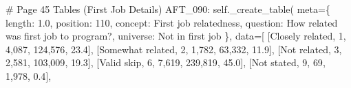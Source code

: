 \documentclass[
  11pt,
  a4paper,
]{article}
\newenvironment{Shaded}{\begin{snugshade}}{\end{snugshade}}
\newcommand{\CommentTok}[1]{\textcolor[rgb]{0.37,0.37,0.37}{#1}}
\newcommand{\NormalTok}[1]{\textcolor[rgb]{0.00,0.23,0.31}{#1}}
\newcommand{\OperatorTok}[1]{\textcolor[rgb]{0.37,0.37,0.37}{#1}}
\newcommand{\StringTok}[1]{\textcolor[rgb]{0.13,0.47,0.30}{#1}}
\newcommand{\VariableTok}[1]{\textcolor[rgb]{0.07,0.07,0.07}{#1}}
\begin{document}
\begin{Shaded}
\begin{Highlighting}[]
    \CommentTok{\# Page 45 Tables (First Job Details)}
    \StringTok{\textquotesingle{}AFT\_090\textquotesingle{}}\NormalTok{: }\VariableTok{self}\NormalTok{.\_create\_table(}
\NormalTok{        meta}\OperatorTok{=}\NormalTok{\{}
            \StringTok{\textquotesingle{}length\textquotesingle{}}\NormalTok{: }\StringTok{\textquotesingle{}1.0\textquotesingle{}}\NormalTok{, }\StringTok{\textquotesingle{}position\textquotesingle{}}\NormalTok{: }\StringTok{\textquotesingle{}110\textquotesingle{}}\NormalTok{,}
            \StringTok{\textquotesingle{}concept\textquotesingle{}}\NormalTok{: }\StringTok{\textquotesingle{}First job relatedness\textquotesingle{}}\NormalTok{,}
            \StringTok{\textquotesingle{}question\textquotesingle{}}\NormalTok{: }\StringTok{\textquotesingle{}How related was first job to program?\textquotesingle{}}\NormalTok{,}
            \StringTok{\textquotesingle{}universe\textquotesingle{}}\NormalTok{: }\StringTok{\textquotesingle{}Not in first job\textquotesingle{}}
\NormalTok{        \},}
\NormalTok{        data}\OperatorTok{=}\NormalTok{[}
\NormalTok{            [}\StringTok{\textquotesingle{}Closely related\textquotesingle{}}\NormalTok{, }\StringTok{\textquotesingle{}1\textquotesingle{}}\NormalTok{, }\StringTok{\textquotesingle{}4,087\textquotesingle{}}\NormalTok{, }\StringTok{\textquotesingle{}124,576\textquotesingle{}}\NormalTok{, }\StringTok{\textquotesingle{}23.4\textquotesingle{}}\NormalTok{],}
\NormalTok{            [}\StringTok{\textquotesingle{}Somewhat related\textquotesingle{}}\NormalTok{, }\StringTok{\textquotesingle{}2\textquotesingle{}}\NormalTok{, }\StringTok{\textquotesingle{}1,782\textquotesingle{}}\NormalTok{, }\StringTok{\textquotesingle{}63,332\textquotesingle{}}\NormalTok{, }\StringTok{\textquotesingle{}11.9\textquotesingle{}}\NormalTok{],}
\NormalTok{            [}\StringTok{\textquotesingle{}Not related\textquotesingle{}}\NormalTok{, }\StringTok{\textquotesingle{}3\textquotesingle{}}\NormalTok{, }\StringTok{\textquotesingle{}2,581\textquotesingle{}}\NormalTok{, }\StringTok{\textquotesingle{}103,009\textquotesingle{}}\NormalTok{, }\StringTok{\textquotesingle{}19.3\textquotesingle{}}\NormalTok{],}
\NormalTok{            [}\StringTok{\textquotesingle{}Valid skip\textquotesingle{}}\NormalTok{, }\StringTok{\textquotesingle{}6\textquotesingle{}}\NormalTok{, }\StringTok{\textquotesingle{}7,619\textquotesingle{}}\NormalTok{, }\StringTok{\textquotesingle{}239,819\textquotesingle{}}\NormalTok{, }\StringTok{\textquotesingle{}45.0\textquotesingle{}}\NormalTok{],}
\NormalTok{            [}\StringTok{\textquotesingle{}Not stated\textquotesingle{}}\NormalTok{, }\StringTok{\textquotesingle{}9\textquotesingle{}}\NormalTok{, }\StringTok{\textquotesingle{}69\textquotesingle{}}\NormalTok{, }\StringTok{\textquotesingle{}1,978\textquotesingle{}}\NormalTok{, }\StringTok{\textquotesingle{}0.4\textquotesingle{}}\NormalTok{],}

\end{Highlighting}
\end{Shaded}
\end{document}
